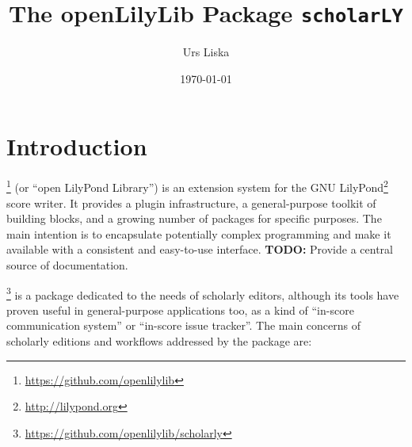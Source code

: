 \documentclass[]{ollmanual}
\title{The openLilyLib Package \texttt{scholarLY}}
\author{Urs Liska}
\date{\today}
\begin{document}
\maketitle

{
\setcounter{tocdepth}{3}
\tableofcontents
}
\pagebreak

\hypertarget{introduction}{%
\section{Introduction}\label{introduction}}

\footnote{\url{https://github.com/openlilylib}}
(or ``open LilyPond Library'') is an extension system for the GNU
LilyPond\footnote{\url{http://lilypond.org}} score writer. It provides a
plugin infrastructure, a general-purpose toolkit of building blocks, and
a growing number of packages for specific purposes. The main intention
is to encapsulate potentially complex programming and make it available
with a consistent and easy-to-use interface. \textbf{TODO:} Provide a
central source of documentation.

\footnote{\url{https://github.com/openlilylib/scholarly}}
is a package dedicated to the needs of scholarly editors, although its
tools have proven useful in general-purpose applications too, as a kind
of ``in-score communication system'' or ``in-score issue tracker''. The
main concerns of scholarly editions and workflows addressed by the
package are:
\end{document}

